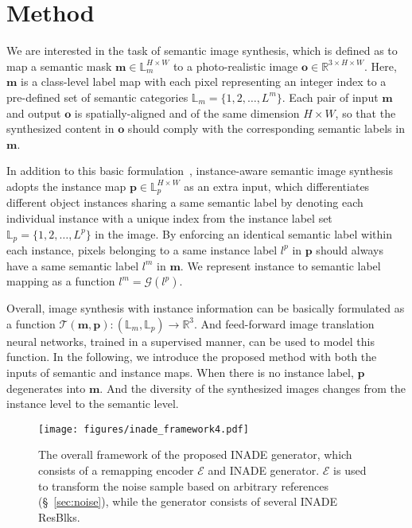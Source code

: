 \documentclass[final]{cvpr}
\begin{document}
\section{Method}
We are interested in the task of semantic image synthesis, which is defined as to map a semantic mask $\bm{m}\in\mathbb{L}_m^{H\times W}$ to a photo-realistic image $\bm{o}\in\mathbb{R}^{3\times H\times W}$. Here, $\bm{m}$ is a class-level label map with each pixel representing an integer index to a pre-defined set of semantic categories $\mathbb{L}_m=\{1,2,\ldots,L^m\}$. Each pair of input $\bm{m}$ and output $\bm{o}$ is spatially-aligned and of the same dimension $H\times W$, so that the synthesized content in $\bm{o}$ should comply with the corresponding semantic labels in $\bm{m}$.

In addition to this basic formulation~\cite{wang2018high,park2019semantic,tan2020semantic}, instance-aware semantic image synthesis~\cite{dundar2020panoptic} adopts the instance map $\bm{p}\in\mathbb{L}_p^{H\times W}$ as an extra input, which differentiates different object instances sharing a same semantic label by denoting each individual instance with a unique index from the instance label set $\mathbb{L}_p=\{1,2,\ldots,L^p\}$ in the image. By enforcing an identical semantic label within each instance, pixels belonging to a same instance label $l^p$ in $\bm{p}$ should always have a same semantic label $l^m$ in $\bm{m}$. We represent instance to semantic label mapping as a function $l^m=\mathcal{G}(l^p)$.

Overall, image synthesis with instance information can be basically formulated as a function $\mathcal{T}(\bm{m},\bm{p}):(\mathbb{L}_m,\mathbb{L}_p)\to\mathbb{R}^3$. And feed-forward image translation neural networks, trained in a supervised manner, can be used to model this function. In the following, we introduce the proposed method with both the inputs of semantic and instance maps. When there is no instance label, $\bm{p}$ degenerates into $\bm{m}$. And the diversity of the synthesized images changes from the instance level to the semantic level.

 \begin{figure*}[t]
  \centering
  \texttt{[image: figures/inade\_framework4.pdf]}
  \caption{The overall framework of the proposed INADE generator, which consists of a remapping encoder $\mathcal{E}$ and INADE generator. $\mathcal{E}$ is used to transform the noise sample based on arbitrary references (\S~\ref{sec:noise}), while the generator consists of several INADE ResBlks.}
  \label{fig:generator}
\end{figure*}
\end{document}
